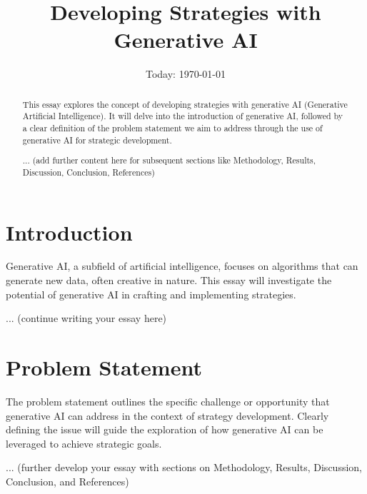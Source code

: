 \documentclass[12pt]{article}
\begin{document}
\title{Developing Strategies with Generative AI}
\author{}
\date{Today: \today}

\maketitle

\begin{abstract}
This essay explores the concept of developing strategies with generative AI (Generative Artificial Intelligence). It will delve into the introduction of generative AI, followed by a clear definition of the problem statement we aim to address through the use of generative AI for strategic development. 

... (add further content here for subsequent sections like Methodology, Results, Discussion, Conclusion, References)
\end{abstract}

\section{Introduction}

Generative AI, a subfield of artificial intelligence, focuses on algorithms that can generate new data,  often creative in nature. This essay will investigate the potential of generative AI in crafting and implementing strategies. 

... (continue writing your essay here)

\section{Problem Statement}

The problem statement outlines the specific challenge or opportunity that generative AI can address in the context of strategy development. Clearly defining the issue will guide the exploration of how generative AI can be leveraged to achieve strategic goals.

... (further develop your essay with sections on Methodology, Results, Discussion, Conclusion, and References)
\end{document}
